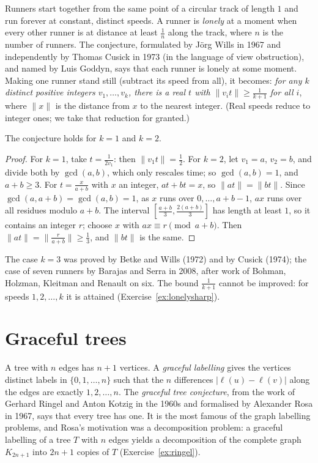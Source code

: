 Runners start together from the same point of a circular track of length $1$ and run forever at constant, distinct speeds. A runner is \emph{lonely} at a moment when every other runner is at distance at least $\frac1n$ along the track, where $n$ is the number of runners. The conjecture, formulated by J\"org Wills in 1967 and independently by Thomas Cusick in 1973 (in the language of view obstruction), and named by Luis Goddyn, says that each runner is lonely at some moment. Making one runner stand still (subtract its speed from all), it becomes: \emph{for any $k$ distinct positive integers $v_1,\dots,v_k$, there is a real $t$ with $\|v_it\|\ge\frac1{k+1}$ for all $i$}, where $\|x\|$ is the distance from $x$ to the nearest integer. (Real speeds reduce to integer ones; we take that reduction for granted.)

\begin{proposition}\label{prop:lonely2}
The conjecture holds for $k=1$ and $k=2$.
\end{proposition}

\begin{proof}
For $k=1$, take $t=\frac1{2v_1}$: then $\|v_1t\|=\frac12$. For $k=2$, let $v_1=a$, $v_2=b$, and divide both by $\gcd(a,b)$, which only rescales time; so $\gcd(a,b)=1$, and $a+b\ge3$. For $t=\frac x{a+b}$ with $x$ an integer, $at+bt=x$, so $\|at\|=\|bt\|$. Since $\gcd(a,a+b)=\gcd(a,b)=1$, as $x$ runs over $0,\dots,a+b-1$, $ax$ runs over all residues modulo $a+b$. The interval $[\frac{a+b}3,\frac{2(a+b)}3]$ has length at least $1$, so it contains an integer $r$; choose $x$ with $ax\equiv r\pmod{a+b}$. Then $\|at\|=\|\frac r{a+b}\|\ge\frac13$, and $\|bt\|$ is the same.
\end{proof}

The case $k=3$ was proved by Betke and Wills (1972) and by Cusick (1974); the case of seven runners by Barajas and Serra in 2008, after work of Bohman, Holzman, Kleitman and Renault on six. The bound $\frac1{k+1}$ cannot be improved: for speeds $1,2,\dots,k$ it is attained (Exercise~\ref{ex:lonelysharp}).

\section{Graceful trees}

A tree with $n$ edges has $n+1$ vertices. A \emph{graceful labelling} gives the vertices distinct labels in $\{0,1,\dots,n\}$ such that the $n$ differences $|\ell(u)-\ell(v)|$ along the edges are exactly $1,2,\dots,n$. The \emph{graceful tree conjecture}, from the work of Gerhard Ringel and Anton Kotzig in the 1960s and formalised by Alexander Rosa in 1967, says that every tree has one. It is the most famous of the graph labelling problems, and Rosa's motivation was a decomposition problem: a graceful labelling of a tree $T$ with $n$ edges yields a decomposition of the complete graph $K_{2n+1}$ into $2n+1$ copies of $T$ (Exercise~\ref{ex:ringel}).


